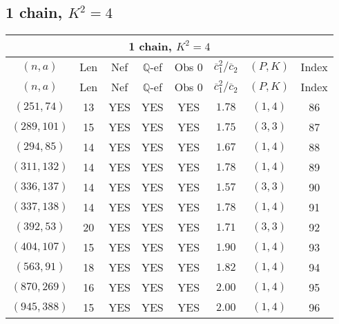 \subsection{1 chain, $K^2 = 4$}
\begin{longtable}{|c|c|c|c|c|c|c|c|}
\hline
\multicolumn{8}{|c|}{1 chain, $K^2 = 4$}\\
\hline
$(n,a)$ & Len & Nef & $\mathbb Q$-ef & Obs 0 & $\overline c_1^2 / \overline c_2$ & $(P,K)$ & Index\\
\hline
\endfirsthead

\hline
$(n,a)$ & Len & Nef & $\mathbb Q$-ef & Obs 0 & $\overline c_1^2 / \overline c_2$ & $(P,K)$ & Index\\
\hline
\endhead
\hline
\endfoot

$(251,74)$ & 13 & YES & YES & YES & $1.78$ & $(1,4)$ & 86\\
$(289,101)$ & 15 & YES & YES & YES & $1.75$ & $(3,3)$ & 87\\
$(294,85)$ & 14 & YES & YES & YES & $1.67$ & $(1,4)$ & 88\\
$(311,132)$ & 14 & YES & YES & YES & $1.78$ & $(1,4)$ & 89\\
$(336,137)$ & 14 & YES & YES & YES & $1.57$ & $(3,3)$ & 90\\
$(337,138)$ & 14 & YES & YES & YES & $1.78$ & $(1,4)$ & 91\\
$(392,53)$ & 20 & YES & YES & YES & $1.71$ & $(3,3)$ & 92\\
$(404,107)$ & 15 & YES & YES & YES & $1.90$ & $(1,4)$ & 93\\
$(563,91)$ & 18 & YES & YES & YES & $1.82$ & $(1,4)$ & 94\\
$(870,269)$ & 16 & YES & YES & YES & $2.00$ & $(1,4)$ & 95\\
$(945,388)$ & 15 & YES & YES & YES & $2.00$ & $(1,4)$ & 96
\end{longtable}
